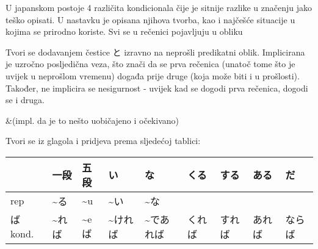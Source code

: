
\author{Tomislav Mamić}


	
	U japanskom postoje 4 različita kondicionala čije je sitnije razlike u značenju jako teško opisati. U nastavku je opisana njihova tvorba, kao i najčešće situacije u kojima se prirodno koriste. Svi se u rečenici pojavljuju u obliku
	
	

	Tvori se dodavanjem čestice と izravno na neprošli predikatni oblik.	Implicirana je uzročno posljedična veza, što znači da se prva rečenica (unatoč tome što je uvijek u neprošlom vremenu) događa prije druge (koja može biti i u prošlosti). Također, ne implicira se nesigurnost - uvijek kad se dogodi prva rečenica, dogodi se i druga.
	
	\begin{reibun}
		&(impl. da je to nešto uobičajeno i očekivano)\\
	\end{reibun}

	
	Tvori se iz glagola i pridjeva prema sljedećoj tablici:
	
	\vspace{10pt}
	\begin{tabular}{|l|l|l|l|l|l|l|l|l|}
		\hline
		&一段&五段&い&な&くる&する&ある&だ\\\hline
		rep&\textasciitilde る&\textasciitilde u&\textasciitilde い&\textasciitilde な&&&&\\\hline
		ば kond.&\textasciitilde れば&\textasciitilde eば&\textasciitilde ければ&\textasciitilde であれば&くれば&すれば&あれば&ならば\\\hline
	\end{tabular}
	\vspace{10pt}

